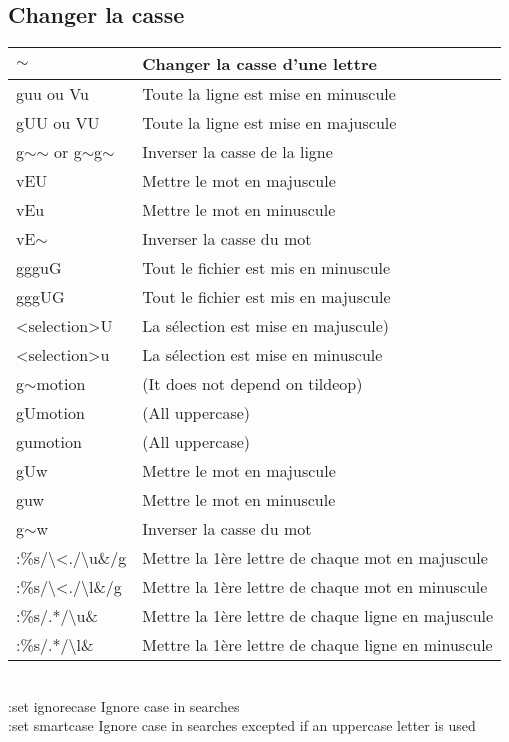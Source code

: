 \documentclass{article}
\begin{document}
\subsection{Changer la casse}
\begin{tabular}{|p{3cm}| l|  }\hline
    $\sim$ & Changer la casse d'une lettre \\ \hline
	guu ou Vu& Toute la ligne est mise en minuscule\\ \hline
	gUU ou VU & Toute la ligne est mise en majuscule\\ \hline
	g$\sim$$\sim$ or g$\sim$g$\sim$ & Inverser la casse de la ligne\\ \hline
	vEU & Mettre le mot en majuscule \\ \hline
	vEu & Mettre le mot en minuscule\\ \hline
	vE$\sim$ & Inverser la casse du mot\\ \hline
	ggguG & Tout le fichier est mis en minuscule\\ \hline
	gggUG & Tout le fichier est mis en majuscule\\ \hline
	<selection>U & La sélection est mise en majuscule) \\ \hline
	<selection>u & La sélection est mise en minuscule \\ \hline
	g$\sim$motion & (It does not depend on tildeop) \\ \hline
	gUmotion & (All uppercase) \\ \hline
	gumotion & (All uppercase) \\ \hline
	gUw & Mettre le mot en majuscule\\ \hline
	guw & Mettre le mot en minuscule \\ \hline
	g$\sim$w & Inverser la casse du mot \\ \hline
    :\%s/\textbackslash{}\textless{}./\textbackslash{}u\&/g & Mettre la 1ère lettre de chaque mot en majuscule \\ \hline
    :\%s/\textbackslash{}\textless{}./\textbackslash{}l\&/g & Mettre la 1ère lettre de chaque mot en minuscule \\ \hline
    :\%s/.*/\textbackslash{}u\& &	Mettre la 1ère lettre de chaque ligne en majuscule\\ \hline
    :\%s/.*/\textbackslash{}l\& &	Mettre la 1ère lettre de chaque ligne en minuscule\\ \hline
\end{tabular}\\
	:set ignorecase 	Ignore case in searches\\
	:set smartcase 	Ignore case in searches excepted if an uppercase letter is used
\end{document}
